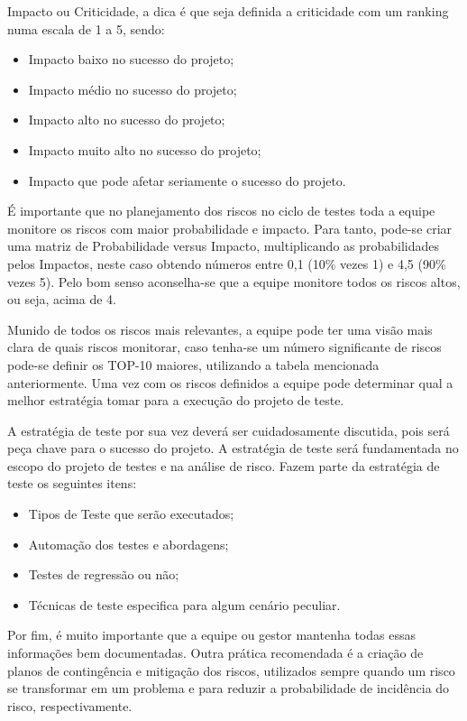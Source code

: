 Impacto ou Criticidade, a dica é que seja definida a criticidade com um ranking numa escala de 1 a 5, sendo:

\begin{itemize}
\item Impacto baixo no sucesso do projeto;
\item Impacto médio no sucesso do projeto;
\item Impacto alto no sucesso do projeto;
\item Impacto muito alto no sucesso do projeto;
\item Impacto que pode afetar seriamente o sucesso do projeto.
\end{itemize}

É importante que no planejamento dos riscos no ciclo de testes toda a equipe monitore os riscos com maior probabilidade e impacto. Para tanto, pode-se criar uma matriz de Probabilidade versus Impacto, multiplicando as probabilidades pelos Impactos, neste caso obtendo números entre 0,1 (10\% vezes 1) e 4,5 (90\% vezes 5). Pelo bom senso aconselha-se que a equipe monitore todos os riscos altos, ou seja, acima de 4.

Munido de todos os riscos mais relevantes, a equipe pode ter uma visão mais clara de quais riscos monitorar, caso tenha-se um número significante de riscos pode-se definir os TOP-10 maiores, utilizando a tabela mencionada anteriormente. Uma vez com os riscos definidos a equipe pode determinar qual a melhor estratégia tomar para a execução do projeto de teste.

A estratégia de teste por sua vez deverá ser cuidadosamente discutida, pois será peça chave para o sucesso do projeto. A estratégia de teste será fundamentada no escopo do projeto de testes e na análise de risco. Fazem parte da estratégia de teste os seguintes itens:

\begin{itemize}
\item Tipos de Teste que serão executados;
\item Automação dos testes e abordagens;
\item Testes de regressão ou não;
\item Técnicas de teste especifica para algum cenário peculiar.
\end{itemize}

Por fim, é muito importante que a equipe ou gestor mantenha todas essas informações bem documentadas. Outra prática recomendada é a criação de planos de contingência e mitigação dos riscos, utilizados sempre quando um risco se transformar em um problema e para reduzir a probabilidade de incidência do risco, respectivamente.

